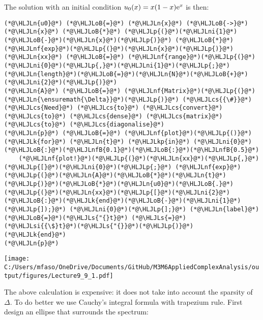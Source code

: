\documentclass[12pt,landscape]{article}
\newcommand{\HLJLk}[1]{\textcolor[RGB]{148,91,176}{\textbf{#1}}}
\newcommand{\HLJLkp}[1]{\textcolor[RGB]{148,91,176}{\textbf{#1}}}
\newcommand{\HLJLn}[1]{#1}
\newcommand{\HLJLnf}[1]{\textcolor[RGB]{66,102,213}{#1}}
\newcommand{\HLJLs}[1]{\textcolor[RGB]{201,61,57}{#1}}
\newcommand{\HLJLsi}[1]{#1}
\newcommand{\HLJLnfB}[1]{\textcolor[RGB]{59,151,46}{#1}}
\newcommand{\HLJLni}[1]{\textcolor[RGB]{59,151,46}{#1}}
\newcommand{\HLJLoB}[1]{\textcolor[RGB]{102,102,102}{\textbf{#1}}}
\newcommand{\HLJLp}[1]{#1}
\newcommand{\HLJLcs}[1]{\textcolor[RGB]{153,153,119}{\textit{#1}}}
\def\E{ {\rm e} }
\def\cent#1{\begin{center}#1\end{center} }
\begin{document}
{The solution with an initial condition $u_0(x) = x (1-x) \E^x$ is then:


\begin{lstlisting}
(*@\HLJLn{u0}@*) (*@\HLJLoB{=}@*) (*@\HLJLn{x}@*) (*@\HLJLoB{->}@*) (*@\HLJLn{x}@*) (*@\HLJLoB{*}@*) (*@\HLJLp{(}@*)(*@\HLJLni{1}@*)(*@\HLJLoB{-}@*)(*@\HLJLn{x}@*)(*@\HLJLp{)}@*) (*@\HLJLoB{*}@*) (*@\HLJLnf{exp}@*)(*@\HLJLp{(}@*)(*@\HLJLn{x}@*)(*@\HLJLp{)}@*)
(*@\HLJLn{xx}@*) (*@\HLJLoB{=}@*) (*@\HLJLnf{range}@*)(*@\HLJLp{(}@*)(*@\HLJLni{0}@*)(*@\HLJLp{,}@*)(*@\HLJLni{1}@*)(*@\HLJLp{;}@*) (*@\HLJLn{length}@*)(*@\HLJLoB{=}@*)(*@\HLJLn{N}@*)(*@\HLJLoB{+}@*)(*@\HLJLni{2}@*)(*@\HLJLp{)}@*)
(*@\HLJLn{A}@*) (*@\HLJLoB{=}@*) (*@\HLJLnf{Matrix}@*)(*@\HLJLp{(}@*)(*@\HLJLn{\ensuremath{\Delta}}@*)(*@\HLJLp{)}@*) (*@\HLJLcs{{\#}}@*) (*@\HLJLcs{Need}@*) (*@\HLJLcs{to}@*) (*@\HLJLcs{convert}@*) (*@\HLJLcs{to}@*) (*@\HLJLcs{dense}@*) (*@\HLJLcs{matrix}@*) (*@\HLJLcs{to}@*) (*@\HLJLcs{diagonalise}@*)
(*@\HLJLn{p}@*) (*@\HLJLoB{=}@*) (*@\HLJLnf{plot}@*)(*@\HLJLp{()}@*)
(*@\HLJLk{for}@*) (*@\HLJLn{t}@*) (*@\HLJLkp{in}@*) (*@\HLJLni{0}@*)(*@\HLJLoB{:}@*)(*@\HLJLnfB{0.1}@*)(*@\HLJLoB{:}@*)(*@\HLJLnfB{0.5}@*)
    (*@\HLJLnf{plot!}@*)(*@\HLJLp{(}@*)(*@\HLJLn{xx}@*)(*@\HLJLp{,}@*) (*@\HLJLp{[}@*)(*@\HLJLni{0}@*)(*@\HLJLp{;}@*) (*@\HLJLnf{exp}@*)(*@\HLJLp{(}@*)(*@\HLJLn{A}@*)(*@\HLJLoB{*}@*)(*@\HLJLn{t}@*)(*@\HLJLp{)}@*)(*@\HLJLoB{*}@*)(*@\HLJLn{u0}@*)(*@\HLJLoB{.}@*)(*@\HLJLp{(}@*)(*@\HLJLn{xx}@*)(*@\HLJLp{[}@*)(*@\HLJLni{2}@*)(*@\HLJLoB{:}@*)(*@\HLJLk{end}@*)(*@\HLJLoB{-}@*)(*@\HLJLni{1}@*)(*@\HLJLp{]);}@*) (*@\HLJLni{0}@*)(*@\HLJLp{];}@*) (*@\HLJLn{label}@*)(*@\HLJLoB{=}@*)(*@\HLJLs{"{}t}@*) (*@\HLJLs{=}@*) (*@\HLJLsi{{\$}t}@*)(*@\HLJLs{"{}}@*)(*@\HLJLp{)}@*)
(*@\HLJLk{end}@*)
(*@\HLJLn{p}@*)
\end{lstlisting}

\cent{\texttt{[image: C:/Users/mfaso/OneDrive/Documents/GitHub/M3M6AppliedComplexAnalysis/output/figures/Lecture9\_9\_1.pdf]}}

The above calculation is expensive: it does not take into account the sparsity of \texttt{\ensuremath{\Delta}}. To do better we use Cauchy's integral formula with trapezium rule. First design an ellipse that surrounds the spectrum:


}
\end{document}
